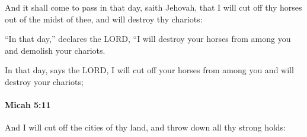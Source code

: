 			\begin{versebox}
					\item[BHS] 
					\item[LXX] 
					\item[ASV] And it shall come to pass in that day, saith Jehovah, that I will cut off thy horses out of the midst of thee, and will destroy thy chariots:
					\item[NIV] “In that day,” declares the LORD, “I will destroy your horses from among you and demolish your chariots.
					\item[NRSV] In that day, says the LORD, I will cut off your horses from among you and will destroy your chariots;
			\end{versebox}

		\paragraph{Micah 5:11} %
			\label{MICAH-5-11}

			And I will cut off the cities of thy land, and throw down all thy strong holds:


